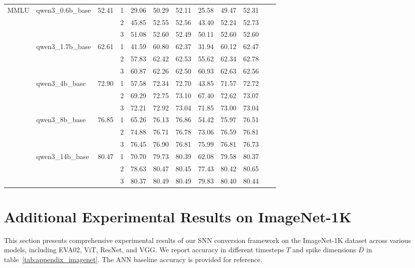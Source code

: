 \begin{table}[htbp]
{\begin{tabular}{llcccccccccc}
    \multirow{15}{*}{MMLU}
    & \multirow{3}{*}{qwen3\_0.6b\_base} & \multirow{3}{*}{52.41}
    & 1 & 29.06 & 50.29 & 52.11 & 25.58 & 49.47 & 52.31 \\
    & & & 2 & 45.85 & 52.55 & 52.56 & 43.40 & 52.24 & 52.73 \\
    & & & 3 & 51.08 & 52.60 & 52.49 & 50.11 & 52.60 & 52.60 \\
    \cmidrule(lr){2-10}
    & \multirow{3}{*}{qwen3\_1.7b\_base} & \multirow{3}{*}{62.61}
    & 1 & 41.59 & 60.80 & 62.37 & 31.94 & 60.12 & 62.47 \\
    & & & 2 & 57.83 & 62.42 & 62.53 & 55.62 & 62.34 & 62.78 \\
    & & & 3 & 60.87 & 62.26 & 62.50 & 60.93 & 62.63 & 62.56 \\
    \cmidrule(lr){2-10}
    & \multirow{3}{*}{qwen3\_4b\_base} & \multirow{3}{*}{72.90}
    & 1 & 57.58 & 72.34 & 72.70 & 43.85 & 71.57 & 72.72 \\
    & & & 2 & 69.29 & 72.75 & 73.10 & 67.40 & 72.62 & 73.07 \\
    & & & 3 & 72.21 & 72.92 & 73.04 & 71.85 & 73.00 & 73.04 \\
    \cmidrule(lr){2-10}
    & \multirow{3}{*}{qwen3\_8b\_base} & \multirow{3}{*}{76.85}
    & 1 & 65.26 & 76.13 & 76.86 & 54.42 & 75.97 & 76.51 \\
    & & & 2 & 74.88 & 76.71 & 76.78 & 73.06 & 76.59 & 76.81 \\
    & & & 3 & 76.45 & 76.90 & 76.81 & 75.99 & 76.81 & 76.73 \\
    \cmidrule(lr){2-10}
    & \multirow{3}{*}{qwen3\_14b\_base} & \multirow{3}{*}{80.47}
    & 1 & 70.70 & 79.73 & 80.39 & 62.08 & 79.58 & 80.37 \\
    & & & 2 & 78.63 & 80.47 & 80.45 & 77.43 & 80.42 & 80.65 \\
    & & & 3 & 80.37 & 80.49 & 80.49 & 79.83 & 80.40 & 80.44 \\

    \bottomrule
  \end{tabular}
  }
\end{table}

\section{Additional Experimental Results on ImageNet-1K}\label{overall_imagenet}

This section presents comprehensive experimental results of our SNN conversion framework on the ImageNet-1K dataset across various models, including EVA02, ViT, ResNet, and VGG. We report accuracy in different timesteps \(T\) and spike dimensions \(D\) in table~\ref{tab:appendix_imagenet}. The ANN baseline accuracy is provided for reference.

